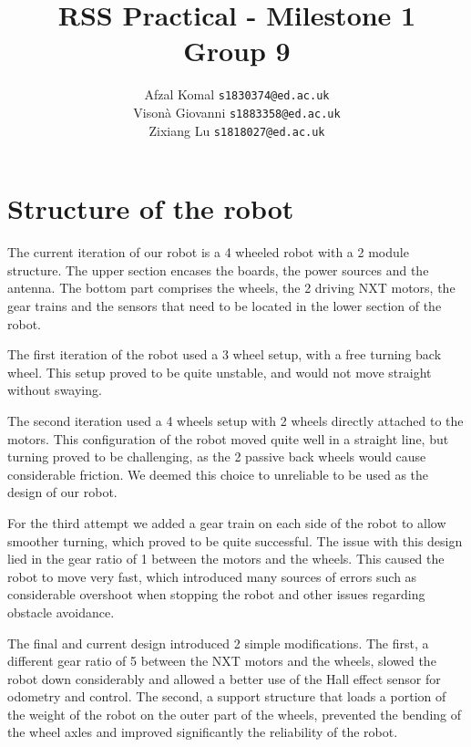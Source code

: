 \documentclass{article}
\title{\vspace{-1.5cm}RSS Practical -  Milestone 1 \\ Group 9} %
\author{Afzal Komal \texttt{s1830374@ed.ac.uk}\\ 
		Vison\`a Giovanni \texttt{s1883358@ed.ac.uk} \\
		Zixiang Lu \texttt{s1818027@ed.ac.uk}} %
\begin{document}

\maketitle %


\section*{Structure of the robot} 

The current iteration of our robot is a 4 wheeled robot with a 2 module structure. 
The upper section encases the boards, the power sources and the antenna. The bottom part comprises the wheels, the 2 driving NXT motors, the gear trains and the sensors that need to be located in the lower section of the robot. 
\newline

The first iteration of the robot used a 3 wheel setup, with a free turning back wheel. This setup proved to be quite unstable, and would not move straight without swaying.

The second iteration used a 4 wheels setup with 2 wheels directly attached to the motors. This configuration of the robot moved quite well in a straight line, but turning proved to be challenging, as the 2 passive back wheels would cause considerable friction. We deemed this choice to unreliable to be used as the design of our robot. 

For the third attempt we added a gear train on each side of the robot to allow smoother turning, which proved to be quite successful. The issue with this design lied in the gear ratio of 1 between the motors and the wheels. This caused the robot to move very fast, which introduced many sources of errors such as considerable overshoot when stopping the robot and other issues regarding obstacle avoidance.

The final and current design introduced 2 simple modifications. The first, a different gear ratio of 5 between the NXT motors and the wheels, slowed the robot down considerably and allowed a better use of the Hall effect sensor for odometry and control. The second, a support structure that loads a portion of the weight of the robot on the outer part of the wheels, prevented the bending of the wheel axles and improved significantly the reliability of the robot.
\end{document}
